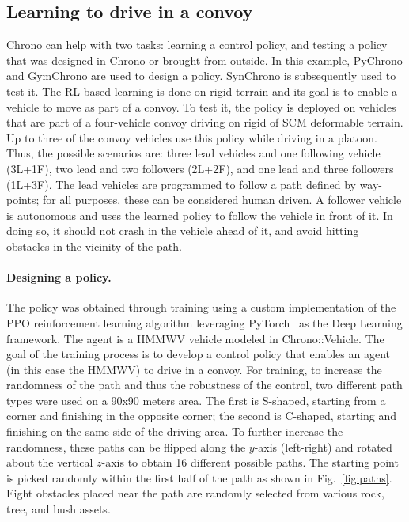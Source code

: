 \documentclass[12pt,twocolumn]{article}
\begin{document}

\subsection{Learning to drive in a convoy}
\label{subsec:learningDemo}
Chrono can help with two tasks: learning a control policy, and testing a policy that was designed in Chrono or brought from outside. In this example, PyChrono and GymChrono are used to design a policy. SynChrono is subsequently used to test it. The RL-based learning is done on rigid terrain and its goal is to enable a vehicle to move as part of a convoy. To test it, the policy is deployed on vehicles that are part of a four-vehicle convoy driving on rigid of SCM deformable terrain. Up to three of the convoy vehicles use this policy while driving in a platoon. Thus, the possible scenarios are: three lead vehicles and one following vehicle (3L+1F), two lead and two followers (2L+2F), and one lead and three followers (1L+3F). The lead vehicles are programmed to follow a path defined by way-points; for all purposes, these can be considered human driven. A follower vehicle is autonomous and uses the learned policy to follow the vehicle in front of it. In doing so, it should not crash in the vehicle ahead of it, and avoid hitting obstacles in the vicinity of the path. 

\paragraph{Designing a policy.} The policy was obtained through training using a custom implementation of the PPO reinforcement learning algorithm leveraging PyTorch~\cite{paszke2017PyTorch} as the Deep Learning framework. The agent is a HMMWV vehicle modeled in Chrono::Vehicle. The goal of the training process is to develop a control policy that enables an agent (in this case the HMMWV) to drive in a convoy. For training, to increase the randomness of the path and thus the robustness of the control, two different path types were used on a 90x90 meters area. The first is S-shaped, starting from a corner and finishing in the opposite corner; the second is C-shaped, starting and finishing on the same side of the driving area. To further increase the randomness, these paths can be flipped along the $y$-axis (left-right) and rotated about the vertical $z$-axis to obtain 16 different possible paths. The starting point is picked randomly within the first half of the path as shown in Fig.~\ref{fig:paths}. Eight obstacles placed near the path are randomly selected from various rock, tree, and bush assets. 
\end{document}

